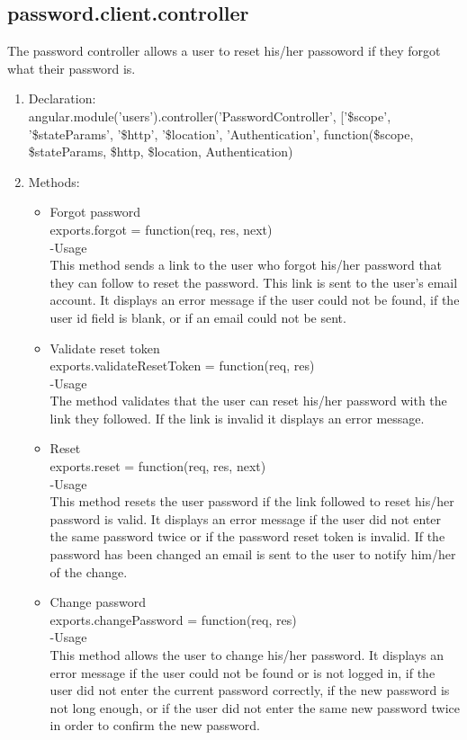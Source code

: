 \documentclass[a4paper,12pt]{article}
\begin{document}
 \subsection{password.client.controller}
 The password controller allows a user to reset his/her passoword if they forgot what their password is. 
 \begin{enumerate}
 \item Declaration:\\angular.module('users').controller('PasswordController', ['\$scope', '\$stateParams', '\$http', '\$location', 'Authentication',
	function(\$scope, \$stateParams, \$http, \$location, Authentication) 
	\item Methods:
	\begin{itemize}
	\item Forgot password\\
 exports.forgot = function(req, res, next)\\
 -Usage\\
 This method sends a link to the user who forgot his/her password that they can follow to reset the password. This link is sent to the user's email account. It displays an error message if the user could not be found, if the user id field is blank, or if an email could not be sent.
 \item Validate reset token\\
 exports.validateResetToken = function(req, res)\\
 -Usage\\
 The method validates that the user can reset his/her password with the link they followed. If the link is invalid it displays an error message.\\
 \item Reset\\
 exports.reset = function(req, res, next)\\
 -Usage\\
 This method resets the user password if the link followed to reset his/her password is valid. It displays an error message if the user did not enter the same password twice or if the password reset token is invalid. If the password has been changed an email is sent to the user to notify him/her of the change.
 \item Change password\\
 exports.changePassword = function(req, res)\\
 -Usage\\
 This method allows the user to change his/her password. It displays an error message if the user could not be found or is not logged in, if the user did not enter the current password correctly, if the new password is not long enough, or if the user did not enter the same new password twice in order to confirm the new password.
	\end{itemize}
 \end{enumerate}
\end{document}
